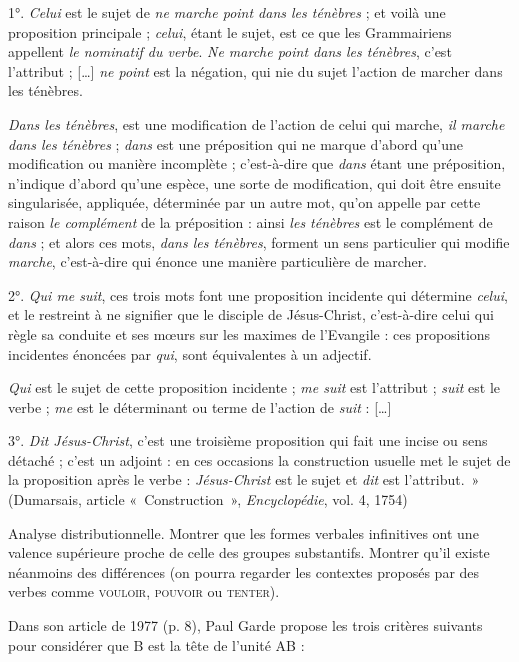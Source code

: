 {    1°. \textit{Celui} est le sujet de \textit{ne marche point dans les ténèbres} ; et voilà une proposition principale ; \textit{celui}, étant le sujet, est ce que les Grammairiens appellent \textit{le nominatif du verbe}. \textit{Ne marche point dans les ténèbres}, c’est l’attribut ; […] \textit{ne point} est la négation, qui nie du sujet l’action de marcher dans les ténèbres.

    \textit{Dans les ténèbres}, est une modification de l’action de celui qui marche, \textit{il marche dans les ténèbres} ; \textit{dans} est une préposition qui ne marque d’abord qu’une modification ou manière incomplète ; c’est-à-dire que \textit{dans} étant une préposition, n’indique d’abord qu’une espèce, une sorte de modification, qui doit être ensuite singularisée, appliquée, déterminée par un autre mot, qu’on appelle par cette raison \textit{le complément} de la préposition : ainsi \textit{les ténèbres} est le complément de \textit{dans} ; et alors ces mots, \textit{dans les ténèbres}, forment un sens particulier qui modifie \textit{marche}, c’est-à-dire qui énonce une manière particulière de marcher.

    2°. \textit{Qui me suit}, ces trois mots font une proposition incidente qui détermine \textit{celui}, et le restreint à ne signifier que le disciple de Jésus-Christ, c’est-à-dire celui qui règle sa conduite et ses mœurs sur les maximes de l’Evangile : ces propositions incidentes énoncées par \textit{qui}, sont équivalentes à un adjectif.

    \textit{Qui} est le sujet de cette proposition incidente ; \textit{me suit} est l’attribut ; \textit{suit} est le verbe ; \textit{me} est le dé​​terminant ou terme de l’action de \textit{suit} : […]

    3°. \textit{Dit Jésus-Christ}, c’est une troisième proposition qui fait une incise ou sens détaché ; c’est un adjoint : en ces occasions la construction usuelle met le sujet de la proposition après le verbe : \textit{Jésus-Christ} est le sujet et \textit{dit} est l’attribut.~» (Dumarsais, article «~Construction~», \textit{Encyclopédie}, vol. 4, 1754)

     Analyse distributionnelle. Montrer que les formes verbales infinitives ont une valence supérieure proche de celle des groupes substantifs. Montrer qu’il existe néanmoins des différences (on pourra regarder les contextes proposés par des verbes comme \textsc{vouloir,} \textsc{pouvoir} ou \textsc{tenter).}

     Dans son article de 1977 (p. 8), Paul Garde propose les trois critères suivants pour considérer que B est la tête de l’unité AB :
    
}
